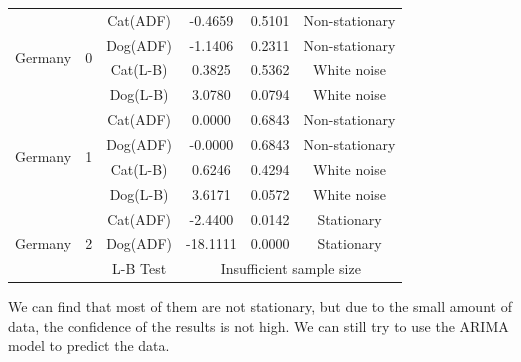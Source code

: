 \documentclass[withoutpreface,bwprint]{cumcmthesis} %
\begin{document}
\begin{table}[htbp]
\begin{tabular}{llcccc}
\midrule
\multirow{4}{*}{Germany} & \multirow{4}{*}{0} & Cat(ADF) & -0.4659 & 0.5101 & Non-stationary \\
& & Dog(ADF) & -1.1406 & 0.2311 & Non-stationary \\
& & Cat(L-B) & 0.3825 & 0.5362 & White noise \\
& & Dog(L-B) & 3.0780 & 0.0794 & White noise \\
\midrule
\multirow{4}{*}{Germany} & \multirow{4}{*}{1} & Cat(ADF) & 0.0000 & 0.6843 & Non-stationary \\
& & Dog(ADF) & -0.0000 & 0.6843 & Non-stationary \\
& & Cat(L-B) & 0.6246 & 0.4294 & White noise \\
& & Dog(L-B) & 3.6171 & 0.0572 & White noise \\
\midrule
\multirow{3}{*}{Germany} & \multirow{3}{*}{2} & Cat(ADF) & -2.4400 & 0.0142 & Stationary \\
& & Dog(ADF) & -18.1111 & 0.0000 & Stationary \\
& & L-B Test & \multicolumn{3}{c}{Insufficient sample size} \\
\bottomrule
\end{tabular}
\end{table}
\par We can find that most of them are not stationary, but due to the small amount of data, the confidence of the results is not high.
We can still try to use the ARIMA model to predict the data.
\clearpage






\end{document}
